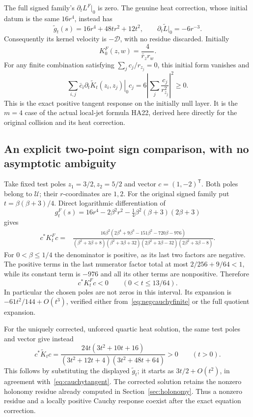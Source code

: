 \documentclass[11pt,a4paper]{article}
\theoremstyle{definition}\newtheorem{definition}[theorem]{Definition}\newtheorem{remark}[theorem]{Remark}
\begin{document}
The full signed family's $\partial_tL^F|_0$ is zero. The genuine heat correction, whose initial datum is the same $16r^4$, instead has
\[
 \widetilde g_t(s)=16r^4+48tr^2+12t^2,\qquad
 \partial_t\widetilde L|_0=-6r^{-3}.
\]
Consequently its kernel velocity is $-\mathcal D$, with no residue discarded. Initially
\[
 K_0^F(z,w)=\frac4{\bar r_zr_w}.
\]
For any finite combination satisfying $\sum_j c_j/r_{z_j}=0$, this initial form vanishes and
\begin{equation}
 \sum_{i,j}\bar c_i\left.\partial_t\widetilde K_t(z_i,z_j)\right|_0c_j
   =6\left|\sum_j\frac{c_j}{r_{z_j}^2}\right|^2\ge0.
                                                        \label{eq:cauchytangent}
\end{equation}
This is the exact positive tangent response on the initially null layer. It is the $m=4$ case of the actual local-jet formula HA22, derived here directly for the original collision and its heat correction.

\subsection{An explicit two-point sign comparison, with no asymptotic ambiguity}
Take fixed test poles $z_1=3/2,z_2=5/2$ and vector $c=(1,-2)^{\mathsf T}$. Both poles belong to $\mathcal U$; their $r$-coordinates are $1,2$. For the original signed family put $t=\beta(\beta+3)/4$. Direct logarithmic differentiation of
\[
 g_t^F(s)=16r^4-2\beta^2r^2
             -\tfrac14\beta^2(\beta+3)(2\beta+3)
\]
gives
\begin{equation}
\begin{split}
 c^*K_t^F c
 ={}&\frac{16\beta^2
 (2\beta^4+9\beta^3-151\beta^2-720\beta-976)}
 {(\beta^2+3\beta+8)(\beta^2+3\beta+32)
  (2\beta^2+3\beta-32)(2\beta^2+3\beta-8)}.
\end{split}                                             \label{eq:negcauchyfinite}
\end{equation}
For $0<\beta\le1/4$ the denominator is positive, as its last two factors are negative. The positive terms in the last numerator factor total at most $2/256+9/64<1$, while its constant term is $-976$ and all its other terms are nonpositive. Therefore
\[
 c^*K_t^Fc<0\qquad (0<t\le13/64).
\]
In particular the chosen poles are not zeros in this interval. Its expansion is $-61t^2/144+O(t^3)$, verified either from~\eqref{eq:negcauchyfinite} or the full quotient expansion.

For the uniquely corrected, unforced quartic heat solution, the same test poles and vector give instead
\begin{equation}
 c^*\widetilde K_t c
 =\frac{24t(3t^2+10t+16)}
 {(3t^2+12t+4)(3t^2+48t+64)}>0\qquad(t>0).             \label{eq:poscauchyfinite}
\end{equation}
This follows by substituting the displayed $\widetilde g_t$; it starts as $3t/2+O(t^2)$, in agreement with~\eqref{eq:cauchytangent}. The corrected solution retains the nonzero holonomy residue already computed in Section~\ref{sec:holonomy}. Thus a nonzero residue and a locally positive Cauchy response coexist after the exact equation correction.
\end{document}
